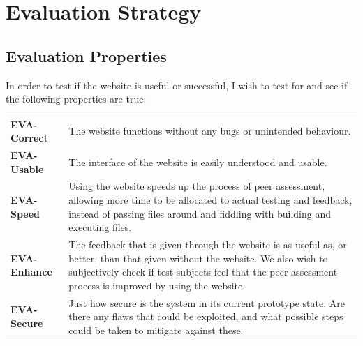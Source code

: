\documentclass[a4paper,11pt]{report}
\newcommand{\eva}[2]{\textbf{EVA-#1} & #2\\}
\begin{document}

\chapter{Evaluation Strategy}

\section{Evaluation Properties}
In order to test if the website is useful or successful, I wish to test for and see if the following properties are true:\\
\begin{tabularx}{\textwidth}{lX}
\eva{Correct}{The website functions without any bugs or unintended behaviour.}
\eva{Usable}{The interface of the website is easily understood and usable.}
\eva{Speed}{Using the website speeds up the process of peer assessment, allowing more time to be allocated to actual testing and feedback, instead of passing files around and fiddling with building and executing files.}
\eva{Enhance}{The feedback that is given through the website is as useful as, or better, than that given without the website. We also wish to subjectively check if test subjects feel that the peer assessment process is improved by using the website.}
\eva{Secure}{Just how secure is the system in its current prototype state. Are there any flaws that could be exploited, and what possible steps could be taken to mitigate against these.}
\end{tabularx}
\end{document}
